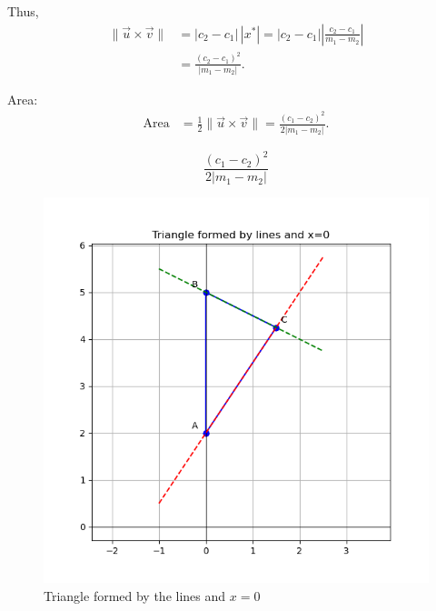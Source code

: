 \documentclass[12pt]{article}
\begin{document}
Thus,
\begin{align}
\|\vec{u} \times \vec{v}\| &= |c_2-c_1|\,|x^*| = |c_2-c_1| \left| \frac{c_2-c_1}{m_1-m_2} \right| \\
&= \frac{(c_2-c_1)^2}{|m_1-m_2|}.
\end{align}

Area:
\begin{align}
\text{Area} &= \tfrac{1}{2} \|\vec{u} \times \vec{v}\| = \frac{(c_1-c_2)^2}{2|m_1-m_2|}.
\end{align}

\[
\boxed{\frac{(c_1-c_2)^2}{2|m_1-m_2|}}
\]

\begin{figure}[H]\centering
\includegraphics[width=1\columnwidth]{figs/plt.png}
\caption{Triangle formed by the lines and $x=0$}
\label{fig:plt}
\end{figure}
\end{document}
